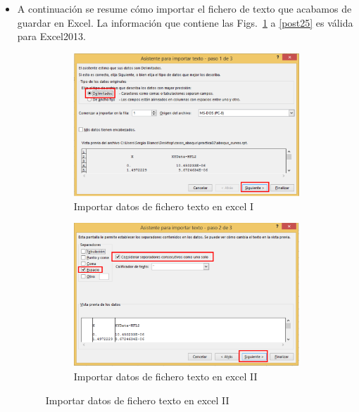 \begin{itemize}
\item A continuación se resume cómo importar el fichero de texto que
  acabamos de guardar en Excel. La información que contiene las
  Figs.~\ref{post22} a \ref{post25} es válida para Excel2013.
  \begin{figure}[!h]
    \centering
    \begin{subfigure}[!h]{0.50\textwidth}
      \includegraphics[width=\textwidth]{./body/images/post22.pdf}
      \caption{Importar datos de fichero texto en excel I}
      \label{post22}
    \end{subfigure}%
    \begin{subfigure}[!h]{0.50\textwidth}
      \includegraphics[width=\textwidth]{./body/images/post23.pdf}
      \caption{Importar datos de fichero texto en excel II}
      \label{post23}
    \end{subfigure}%


\end{figure}
\end{itemize}
